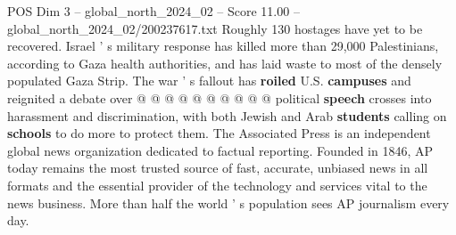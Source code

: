 \begin{textsample}{POS Dim 3 – global\_north\_2024\_02 – Score 11.00 – global\_north\_2024\_02/200237617.txt}
Roughly 130 hostages have yet to be recovered.
Israel ' s military response has killed more than 29,000 Palestinians, according to Gaza health authorities, and has laid waste to most of the densely populated Gaza Strip.
The war ' s fallout has \textbf{roiled} U.S. \textbf{campuses} and reignited a debate over @ @ @ @ @ @ @ @ @ @ political \textbf{speech} crosses into harassment and discrimination, with both Jewish and Arab \textbf{students} calling on \textbf{schools} to do more to protect them.
The Associated Press is an independent global news organization dedicated to factual reporting.
Founded in 1846, AP today remains the most trusted source of fast, accurate, unbiased news in all formats and the essential provider of the technology and services vital to the news business.
More than half the world ' s population sees AP journalism every day.

\end{textsample}
